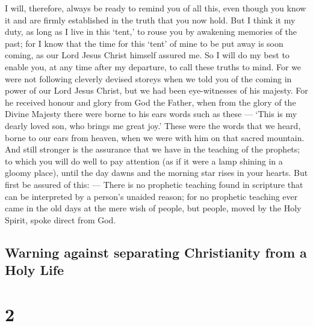  I will, therefore, always be ready to remind you of all
this, even though you know it and are firmly established in the truth
that you now hold.  But I think it my duty, as long as I
live in this `tent,' to rouse you by awakening memories of the past;
 for I know that the time for this `tent' of mine to be put
away is soon coming, as our Lord Jesus Christ himself assured me.
 So I will do my best to enable you, at any time after my
departure, to call these truths to mind.  For we were not
following cleverly devised storeys when we told you of the coming in
power of our Lord Jesus Christ, but we had been eye-witnesses of his
majesty.  For he received honour and glory from God the
Father, when from the glory of the Divine Majesty there were borne to
his ears words such as these --- `This is my dearly loved son, who
brings me great joy.'  These were the words that we heard,
borne to our ears from heaven, when we were with him on that sacred
mountain.  And still stronger is the assurance that we have
in the teaching of the prophets; to which you will do well to pay
attention (as if it were a lamp shining in a gloomy place), until the
day dawns and the morning star rises in your hearts.  But
first be assured of this: --- There is no prophetic teaching found in
scripture that can be interpreted by a person's unaided reason;
 for no prophetic teaching ever came in the old days at the
mere wish of people, but people, moved by the Holy Spirit, spoke direct
from God.

\hypertarget{warning-against-separating-christianity-from-a-holy-life}{%
\subsection{Warning against separating Christianity from a Holy
Life}\label{warning-against-separating-christianity-from-a-holy-life}}

\hypertarget{section-1}{%
\section{2}\label{section-1}}

